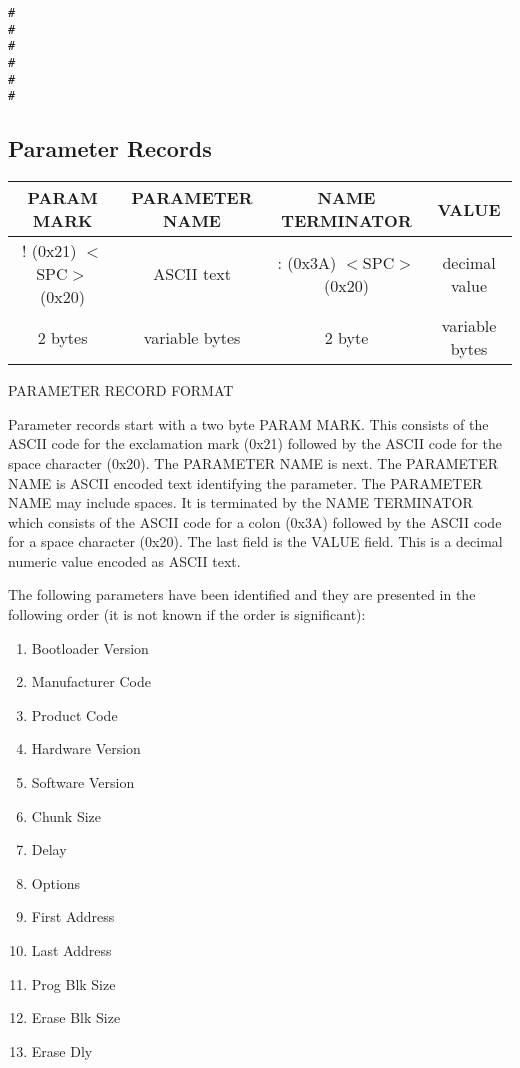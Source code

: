 \begin{verbatim}
#
#
#
#
#
#
\end{verbatim}

\subsection{Parameter Records}

\begin{center}
\begin{tabular}{| c | c | c | c | }
\hline
PARAM MARK & PARAMETER NAME & NAME TERMINATOR & VALUE\\
\hline
! (0x21) $<$SPC$>$ (0x20) & ASCII text & : (0x3A) $<$SPC$>$ (0x20) & decimal value \\
\hline
2 bytes & variable bytes & 2 byte & variable bytes\\
\hline
\end{tabular}

PARAMETER RECORD FORMAT
\end{center}

Parameter records start with a two byte PARAM MARK. This consists of the ASCII code for the exclamation mark (0x21) followed by the ASCII code for the space character (0x20). The PARAMETER NAME is next. The PARAMETER NAME is ASCII encoded text identifying the parameter. The PARAMETER NAME may include spaces. It is terminated by the NAME TERMINATOR which consists of the ASCII code for a colon (0x3A) followed by the ASCII code for a space character (0x20). The last field is the VALUE field. This is a decimal numeric value encoded as ASCII text.

The following parameters have been identified and they are presented in the following order (it is not known if the order is significant):

\begin{enumerate}
\item Bootloader Version
\item Manufacturer Code
\item Product Code
\item Hardware Version
\item Software Version
\item Chunk Size
\item Delay
\item Options
\item First Address
\item Last Address
\item Prog Blk Size
\item Erase Blk Size
\item Erase Dly
\end{enumerate}

